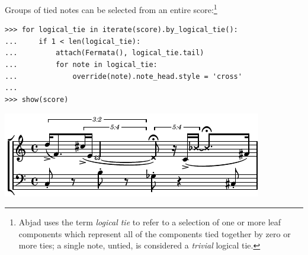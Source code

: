 \documentclass{article}
\begin{document}
\noindent Groups of tied notes can be selected from an entire
score:\footnote{Abjad uses the term \emph{logical tie} to refer to a selection
of one or more leaf components which represent all of the components tied
together by zero or more ties; a single note, untied, is considered a
\emph{trivial} logical tie.}

\begin{lstlisting}
>>> for logical_tie in iterate(score).by_logical_tie():
...     if 1 < len(logical_tie):
...         attach(Fermata(), logical_tie.tail)
...         for note in logical_tie:
...             override(note).note_head.style = 'cross'
...
>>> show(score)
\end{lstlisting}
\includegraphics{assets/lilypond-a692b35a07435259861a4299267be394.pdf}
\end{document}
